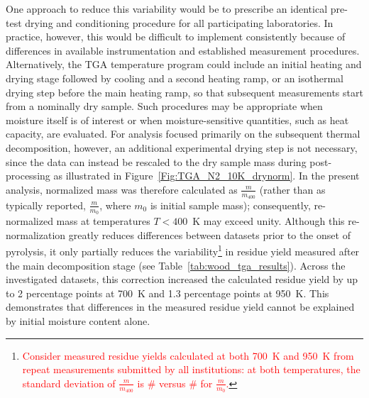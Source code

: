 \documentclass{book}
\begin{document}
One approach to reduce this variability would be to prescribe an identical pre-test drying and conditioning procedure for all participating laboratories. In practice, however, this would be difficult to implement consistently because of differences in available instrumentation and established measurement procedures.
Alternatively, the TGA temperature program could include an initial heating and drying stage followed by cooling and a second heating ramp, or an isothermal drying step before the main heating ramp, so that subsequent measurements start from a nominally dry sample. Such procedures may be appropriate when moisture itself is of interest or when moisture-sensitive quantities, such as heat capacity, are evaluated. For analysis focused primarily on the subsequent thermal decomposition, however, an additional experimental drying step is not necessary, since the data can instead be rescaled to the dry sample mass during post-processing as illustrated in Figure~\ref{Fig:TGA_N2_10K_drynorm}.
In the present analysis, normalized mass was therefore calculated as $\frac{m}{m_{400}}$ (rather than as typically reported, $\frac{m}{m_{0}}$, where ${m_{0}}$ is initial sample mass); consequently, re-normalized mass at temperatures $T<400$~K may exceed unity. Although this re-normalization greatly reduces differences between datasets prior to the onset of pyrolysis, it only partially reduces the variability\footnote{\textcolor{red}{Consider measured residue yields calculated at both 700~K and 950~K from repeat measurements submitted by all institutions: at both temperatures, the standard deviation of $\frac{m}{m_{400}}$ is \# versus \# for $\frac{m}{m_{0}}$.}} in residue yield measured after the main decomposition stage (see Table~\ref{tab:wood_tga_results}). Across the investigated datasets, this correction increased the calculated residue yield by up to 2 percentage points at 700~K and 1.3 percentage points at 950~K. This demonstrates that differences in the measured residue yield cannot be explained by initial moisture content alone.
\end{document}
